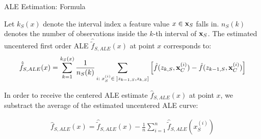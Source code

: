 \documentclass[11pt,compress,t,notes=noshow, xcolor=table]{beamer}
\begin{document}
%
%
%
%
%
%
%
%
%
%
%
%
%
%
%
%
%
%
%
%
%

\begin{vbframe}{ALE Estimation: Formula}

Let $k_S(x)$ denote the interval index a feature value $x \in \xv_S$ falls in. $n_S(k)$ denotes the number of observations inside the $k$-th interval of $\xv_S$. The estimated uncentered first order ALE $\hat{\tilde{f}}_{S, ALE}(x)$ at point $x$ corresponds to:
$$
\begin{aligned}
\hat{\tilde{f}}_{S, ALE}(x) = \sum_{k = 1}^{k_S(x)}\frac{1}{n_S(k)}\sum_{i: \; x_S^{(i)} \in \; ]z_{k-1, S}, z_{k, S}]}\left[\fh(z_{k, S}, \xi_C) -\fh(z_{k-1, S}, \xi_C)\right]
\end{aligned}
$$

In order to receive the centered ALE estimate $\hat{f}_{S, ALE}(x)$ at point $x$, we substract the average of the estimated uncentered ALE curve:

$$
\begin{aligned}
\hat{f}_{S, ALE}(x) = \hat{\tilde{f}}_{S, ALE}(x) - \frac{1}{n}\sum_{i = 1}^n \hat{\tilde{f}}_{S, ALE}(x_S^{(i)})
\end{aligned}
$$

\end{vbframe}
\end{document}
